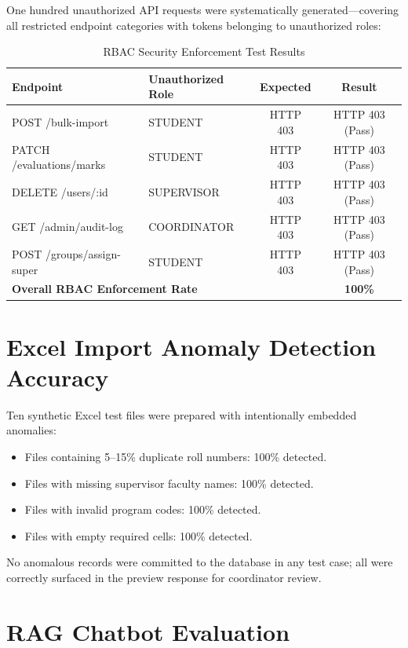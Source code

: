 \documentclass[12pt]{report}
\begin{document}
One hundred unauthorized API requests were systematically generated---covering all restricted endpoint categories with tokens belonging to unauthorized roles:

\begin{table}[H]
\centering
\caption{RBAC Security Enforcement Test Results}\label{tab:rbac_test}
\begin{tabular}{l l c c}
\toprule
\textbf{Endpoint} & \textbf{Unauthorized Role} & \textbf{Expected} & \textbf{Result}\\
\midrule
POST /bulk-import          & STUDENT       & HTTP 403 & HTTP 403 (Pass)\\
PATCH /evaluations/marks   & STUDENT       & HTTP 403 & HTTP 403 (Pass)\\
DELETE /users/:id          & SUPERVISOR    & HTTP 403 & HTTP 403 (Pass)\\
GET /admin/audit-log       & COORDINATOR   & HTTP 403 & HTTP 403 (Pass)\\
POST /groups/assign-super  & STUDENT       & HTTP 403 & HTTP 403 (Pass)\\
\midrule
\multicolumn{2}{l}{\textbf{Overall RBAC Enforcement Rate}} & & \textbf{100\%}\\
\bottomrule
\end{tabular}
\end{table}

\section{Excel Import Anomaly Detection Accuracy}

Ten synthetic Excel test files were prepared with intentionally embedded anomalies:

\begin{itemize}[leftmargin=*]
  \item Files containing 5--15\% duplicate roll numbers: 100\% detected.
  \item Files with missing supervisor faculty names: 100\% detected.
  \item Files with invalid program codes: 100\% detected.
  \item Files with empty required cells: 100\% detected.
\end{itemize}

No anomalous records were committed to the database in any test case; all were correctly surfaced in the preview response for coordinator review.

\section{RAG Chatbot Evaluation}
\end{document}
